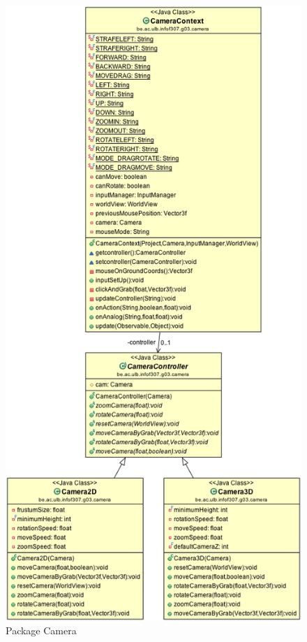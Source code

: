 	\begin{figure}
		\center
		\includegraphics[width=\textwidth]{iteration4/fig/camera.png}
		\caption{Package Camera}
	\end{figure}

